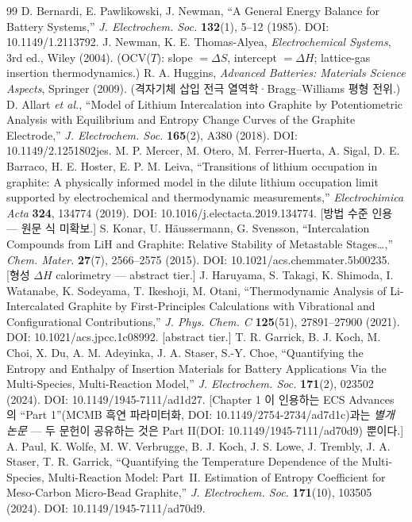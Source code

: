 \begin{thebibliography}{99}
 D. Bernardi, E. Pawlikowski, J. Newman, ``A General Energy Balance for Battery Systems,'' \emph{J. Electrochem. Soc.} \textbf{132}(1), 5--12 (1985). DOI: 10.1149/1.2113792.
 J. Newman, K. E. Thomas-Alyea, \emph{Electrochemical Systems}, 3rd ed., Wiley (2004). (OCV($T$): slope $=\Delta S$, intercept $=\Delta H$; lattice-gas insertion thermodynamics.)
 R. A. Huggins, \emph{Advanced Batteries: Materials Science Aspects}, Springer (2009). (격자기체 삽입 전극 열역학·Bragg--Williams 평형 전위.)
 D. Allart \emph{et al.}, ``Model of Lithium Intercalation into Graphite by Potentiometric Analysis with Equilibrium and Entropy Change Curves of the Graphite Electrode,'' \emph{J. Electrochem. Soc.} \textbf{165}(2), A380 (2018). DOI: 10.1149/2.1251802jes.
 M. P. Mercer, M. Otero, M. Ferrer-Huerta, A. Sigal, D. E. Barraco, H. E. Hoster, E. P. M. Leiva, ``Transitions of lithium occupation in graphite: A physically informed model in the dilute lithium occupation limit supported by electrochemical and thermodynamic measurements,'' \emph{Electrochimica Acta} \textbf{324}, 134774 (2019). DOI: 10.1016/j.electacta.2019.134774. [방법 수준 인용 --- 원문 식 미확보.]
 S. Konar, U. Häussermann, G. Svensson, ``Intercalation Compounds from LiH and Graphite: Relative Stability of Metastable Stages\ldots,'' \emph{Chem. Mater.} \textbf{27}(7), 2566--2575 (2015). DOI: 10.1021/acs.chemmater.5b00235. [형성 $\Delta H$ calorimetry --- abstract tier.]
 J. Haruyama, S. Takagi, K. Shimoda, I. Watanabe, K. Sodeyama, T. Ikeshoji, M. Otani, ``Thermodynamic Analysis of Li-Intercalated Graphite by First-Principles Calculations with Vibrational and Configurational Contributions,'' \emph{J. Phys. Chem. C} \textbf{125}(51), 27891--27900 (2021). DOI: 10.1021/acs.jpcc.1c08992. [abstract tier.]
 T. R. Garrick, B. J. Koch, M. Choi, X. Du, A. M. Adeyinka, J. A. Staser, S.-Y. Choe, ``Quantifying the Entropy and Enthalpy of Insertion Materials for Battery Applications Via the Multi-Species, Multi-Reaction Model,'' \emph{J. Electrochem. Soc.} \textbf{171}(2), 023502 (2024). DOI: 10.1149/1945-7111/ad1d27. [Chapter 1 이 인용하는 ECS Advances 의 ``Part 1''(MCMB 흑연 파라미터화, DOI: 10.1149/2754-2734/ad7d1c)과는 \emph{별개 논문} --- 두 문헌이 공유하는 것은 Part II(DOI: 10.1149/1945-7111/ad70d9) 뿐이다.]
 A. Paul, K. Wolfe, M. W. Verbrugge, B. J. Koch, J. S. Lowe, J. Trembly, J. A. Staser, T. R. Garrick, ``Quantifying the Temperature Dependence of the Multi-Species, Multi-Reaction Model: Part~II. Estimation of Entropy Coefficient for Meso-Carbon Micro-Bead Graphite,'' \emph{J. Electrochem. Soc.} \textbf{171}(10), 103505 (2024). DOI: 10.1149/1945-7111/ad70d9.

\end{thebibliography}
